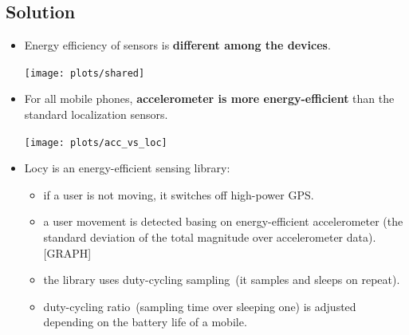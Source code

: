 \documentclass[a2,landscape]{a0poster}
\begin{document}
\mbox{}\framebreak
\begin{center}
\section*{Solution}
\end{center}
\begin{itemize}
   \item Energy efficiency of sensors is \textbf{different among the devices}.
   
\texttt{[image: plots/shared]}

   \item For all mobile phones, \textbf{accelerometer is more energy-efficient} than the standard localization sensors.

\texttt{[image: plots/acc\_vs\_loc]}

   \item Locy is an energy-efficient sensing library:
  	   \begin{itemize}		
  	   \item if a user is not moving, it switches off high-power GPS. 
  	   \item a user movement is detected basing on energy-efficient accelerometer (the standard deviation of the total magnitude over accelerometer data). [GRAPH]
  	   \item the library uses duty-cycling sampling\ (it samples and sleeps on repeat).
  	   \item duty-cycling ratio\ (sampling time over sleeping one) is adjusted depending on the battery life of a mobile. 
    \end{itemize} 
  \end{itemize}
\end{document}
